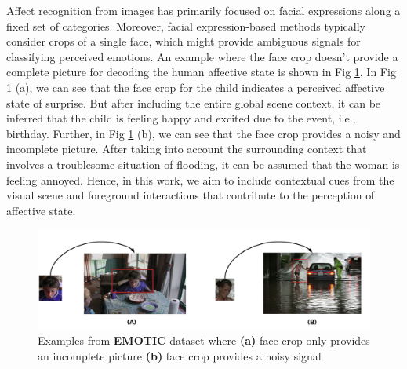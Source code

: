 Affect recognition from images has primarily focused on facial expressions \cite{DFEW,Mollahosseini2019AffectNetAD} along a fixed set of categories. Moreover, facial expression-based methods typically consider crops of a single face, which might provide ambiguous signals for classifying perceived emotions. An example where the face crop doesn't provide a complete picture for decoding the human affective state is shown in Fig \ref{face crop}. In Fig \ref{face crop} (a), we can see that the face crop for the child indicates a perceived affective state of surprise. But after including the entire global scene context, it can be inferred that the child is feeling happy and excited due to the event, i.e., birthday.
Further, in Fig \ref{face crop} (b), we can see that the face crop provides a noisy and incomplete picture. After taking into account the surrounding context that involves a troublesome situation of flooding, it can be assumed that the woman is feeling annoyed. Hence, in this work, we aim to include contextual cues from the visual scene and foreground interactions that contribute to the perception of affective state.

\begin{figure}[h!]
    \centering
    \includegraphics[width=\textwidth]{figures/face_crop_drawings.pdf}
    \caption{Examples from \textbf{EMOTIC} dataset where \textbf{(a)} face crop only provides an incomplete picture \textbf{(b)} face crop provides a noisy signal }
    \label{face crop}
\end{figure}



